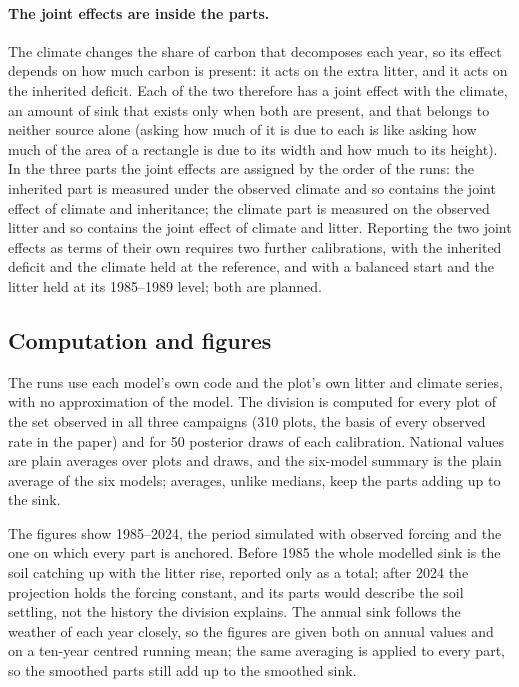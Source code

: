\documentclass[../HIKET_draft_v1.tex]{subfiles}
\begin{document}
\paragraph{The joint effects are inside the parts.} The climate changes the share of carbon
that decomposes each year, so its effect depends on how much carbon is present: it acts on
the extra litter, and it acts on the inherited deficit. Each of the two therefore has a joint
effect with the climate, an amount of sink that exists only when both are present, and that
belongs to neither source alone (asking how much of it is due to each is like asking how much
of the area of a rectangle is due to its width and how much to its height). In the three
parts the joint effects are assigned by the order of the runs: the inherited part is measured
under the observed climate and so contains the joint effect of climate and inheritance; the
climate part is measured on the observed litter and so contains the joint effect of climate
and litter. Reporting the two joint effects as terms of their own requires two further
calibrations, with the inherited deficit and the climate held at the reference, and with a
balanced start and the litter held at its 1985--1989 level; both are planned.

\subsection{Computation and figures}

The runs use each model's own code and the plot's own litter and climate series, with no
approximation of the model. The division is computed for every plot of the set observed in
all three campaigns (310 plots, the basis of every observed rate in the paper) and for 50
posterior draws of each calibration. National values are plain averages over plots and
draws, and the six-model summary is the plain average of the six models; averages, unlike
medians, keep the parts adding up to the sink.

The figures show 1985--2024, the period simulated with observed forcing and the one on which
every part is anchored. Before 1985 the whole modelled sink is the soil catching up with the
litter rise, reported only as a total; after 2024 the projection holds the forcing constant,
and its parts would describe the soil settling, not the history the division explains. The
annual sink follows the weather of each year closely, so the figures are given both on
annual values and on a ten-year centred running mean; the same averaging is applied to every
part, so the smoothed parts still add up to the smoothed sink.
\end{document}
